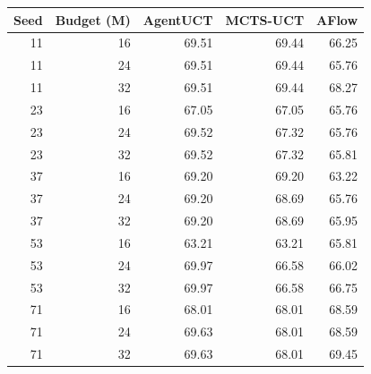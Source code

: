 \begin{tabular}{@{}rrrrr@{}}
\toprule
Seed & Budget (M) & AgentUCT & MCTS-UCT & AFlow\\
\midrule
11 & 16 & 69.51 & 69.44 & 66.25\\
11 & 24 & 69.51 & 69.44 & 65.76\\
11 & 32 & 69.51 & 69.44 & 68.27\\
23 & 16 & 67.05 & 67.05 & 65.76\\
23 & 24 & 69.52 & 67.32 & 65.76\\
23 & 32 & 69.52 & 67.32 & 65.81\\
37 & 16 & 69.20 & 69.20 & 63.22\\
37 & 24 & 69.20 & 68.69 & 65.76\\
37 & 32 & 69.20 & 68.69 & 65.95\\
53 & 16 & 63.21 & 63.21 & 65.81\\
53 & 24 & 69.97 & 66.58 & 66.02\\
53 & 32 & 69.97 & 66.58 & 66.75\\
71 & 16 & 68.01 & 68.01 & 68.59\\
71 & 24 & 69.63 & 68.01 & 68.59\\
71 & 32 & 69.63 & 68.01 & 69.45\\
\bottomrule
\end{tabular}
